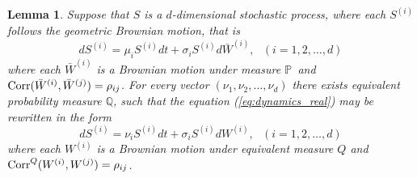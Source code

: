 \documentclass[a4paper,11pt, twoside]{book}
\newtheorem{lemma}[thm]{Lemma}
\theoremstyle{definition}
\theoremstyle{remark}
\def\P{{\mathbb{P}}\,}
\def\Corr{{\hbox{Corr}}}
\begin{document}
\begin{lemma}
\label{lemma:measure_change}
 Suppose that $S$ is a $d$-dimensional stochastic process, where each $S^{(i)}$ follows the geometric Brownian motion, that is
 \begin{equation}
  \label{eq:dynamics_real}
  dS^{(i)} = \mu_i S^{(i)} dt + \sigma_i S^{(i)} d\bar{W}^{(i)},\ \ \ (i=1,2,\ldots,d)
 \end{equation}
 where each $\bar{W}^{(i)}$ is a Brownian motion under measure $\P$ and $\Corr(\bar{W}^{(i)}, \bar{W}^{(j)}) = \rho_{ij}$. For every vector $(\nu_1, \nu_2, \ldots, \nu_d)$ there exists equivalent probability measure $\mathbb{Q}$, such that the equation (\ref{eq:dynamics_real}) may be rewritten in the form
  \begin{equation}
  dS^{(i)} = \nu_i S^{(i)} dt + \sigma_i S^{(i)} dW^{(i)},\ \ \ (i=1,2,\ldots,d)
 \end{equation}
 where each $W^{(i)}$ is a Brownian motion under equivalent measure $Q$ and\\ $\Corr^Q(W^{(i)}, W^{(j)}) = \rho_{ij}$.
\end{lemma}
\end{document}
